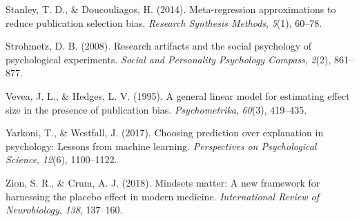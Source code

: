 \documentclass[
  man,floatsintext]{apa6}
\newlength{\cslhangindent}
\newlength{\cslentryspacingunit} %
\newenvironment{CSLReferences}[2] %
 {%
  \setlength{\parindent}{0pt}
  \ifodd #1
  \let\oldpar\par
  \def\par{\hangindent=\cslhangindent\oldpar}
  \fi
  \setlength{\parskip}{#2\cslentryspacingunit}
 }%
 {}
\begin{document}
\begin{CSLReferences}{1}{0}
\leavevmode{}%
Stanley, T. D., \& Doucouliagos, H. (2014). Meta-regression approximations to reduce publication selection bias. \emph{Research Synthesis Methods}, \emph{5}(1), 60--78.

\leavevmode{}%
Strohmetz, D. B. (2008). Research artifacts and the social psychology of psychological experiments. \emph{Social and Personality Psychology Compass}, \emph{2}(2), 861--877.

\leavevmode{}%
Vevea, J. L., \& Hedges, L. V. (1995). A general linear model for estimating effect size in the presence of publication bias. \emph{Psychometrika}, \emph{60}(3), 419--435.

\leavevmode{}%
Yarkoni, T., \& Westfall, J. (2017). Choosing prediction over explanation in psychology: Lessons from machine learning. \emph{Perspectives on Psychological Science}, \emph{12}(6), 1100--1122.

\leavevmode{}%
Zion, S. R., \& Crum, A. J. (2018). Mindsets matter: A new framework for harnessing the placebo effect in modern medicine. \emph{International Review of Neurobiology}, \emph{138}, 137--160.

\end{CSLReferences}
\end{document}
